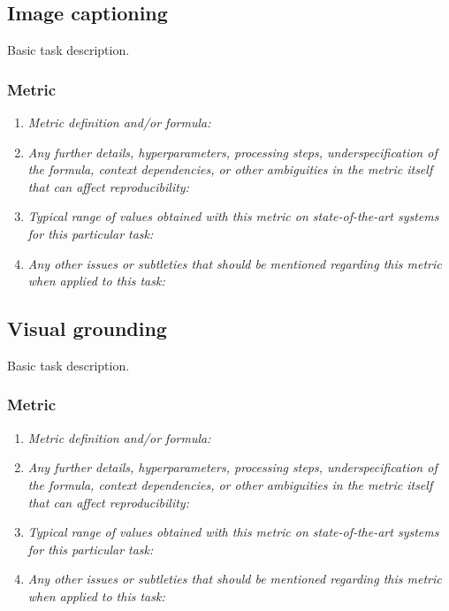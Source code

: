 \documentclass[a4paper,11pt]{article}
\begin{document}
\subsection{Image captioning}
    Basic task description.
    \subsubsection{Metric}
        \begin{enumerate}[label=\alph*.]
            \item \textit{Metric definition and/or formula:}
            \bigskip
            \item \textit{Any further details, hyperparameters, processing steps, underspecification of the formula, context dependencies, or other ambiguities in the metric itself that can affect reproducibility:}
            \bigskip
            \item \textit{Typical range of values obtained with this metric on state-of-the-art systems for this particular task:}
            \bigskip
            \item \textit{Any other issues or subtleties that should be mentioned regarding this metric when applied to this task:}
            \bigskip
        \end{enumerate}

\subsection{Visual grounding} \label{visual_grounding}
    Basic task description.
    \subsubsection{Metric}
        \begin{enumerate}[label=\alph*.]
            \item \textit{Metric definition and/or formula:}
            \bigskip
            \item \textit{Any further details, hyperparameters, processing steps, underspecification of the formula, context dependencies, or other ambiguities in the metric itself that can affect reproducibility:}
            \bigskip
            \item \textit{Typical range of values obtained with this metric on state-of-the-art systems for this particular task:}
            \bigskip
            \item \textit{Any other issues or subtleties that should be mentioned regarding this metric when applied to this task:}
            \bigskip
        \end{enumerate}
\end{document}
